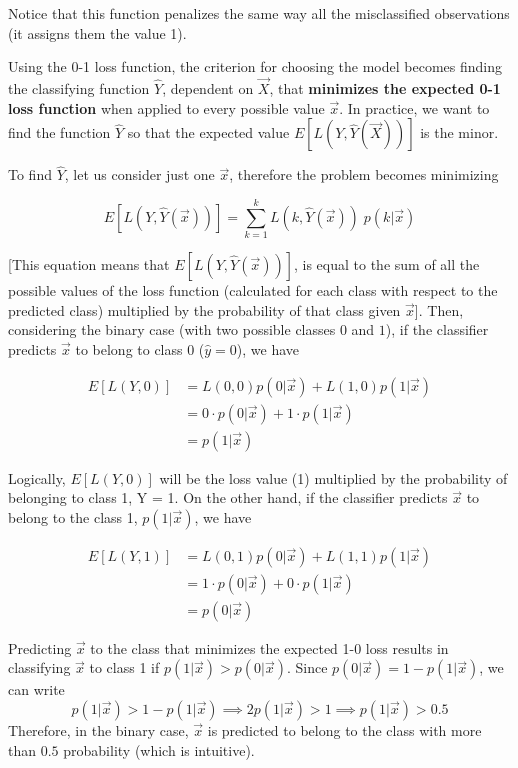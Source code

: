     Notice that this function penalizes the same way all the misclassified
    observations (it assigns them the value 1).  
    
    Using the 0-1 loss function, the criterion for choosing the model becomes
    finding the classifying function $\hat{Y}$, dependent on $\vec{X}$, that
    \textbf{minimizes the expected 0-1 loss function} when applied to every
    possible value $ \vec{x} $. In practice, we want to find the function $\hat{Y}$
    so that the expected value $ E[L(Y, \hat{Y}(\vec{X}))]$ is the minor.

    To find $\hat{Y}$, let us consider just one $\vec{x}$, therefore the problem
    becomes minimizing 

    $$E[L(Y, \hat{Y}(\vec{x}))] = \sum_{k=1}^k L(k, \hat{Y}(\vec{x})) \;
    p(k|\vec{x})$$

	[This equation means that $ E[L(Y, \hat{Y}(\vec{x}))] $, is equal to the sum
    of all the possible values of the loss function (calculated for each class
    with respect to the predicted class) multiplied by the probability of that
    class given $ \vec{x} $]. Then, considering the binary case (with two
    possible classes $0$ and $1$), if the classifier predicts $\vec{x}$ to
    belong to class 0 ($\hat{y} = 0$), we have 

    \begin{align*}
      E[L(Y,0)] & = L(0,0)p(0|\vec{x}) + L(1, 0)p(1|\vec{x}) \\
                & = 0 \cdot p(0|\vec{x}) + 1 \cdot p(1|\vec{x}) \\
                & = p(1|\vec{x})
    \end{align*}

Logically, $ E[L(Y,0)] $ will be the loss value (1) multiplied by the
probability of  belonging to class 1, Y = 1. On the other hand, if the
classifier predicts $\vec{x}$ to belong to the class 1, $p(1|\vec{x})$, we have

    \begin{align*}
      E[L(Y,1)] & = L(0,1)p(0|\vec{x}) + L(1, 1)p(1|\vec{x}) \\
                & = 1 \cdot p(0|\vec{x}) + 0 \cdot p(1|\vec{x}) \\
                & = p(0|\vec{x})
    \end{align*}

    Predicting $\vec{x}$ to the class that minimizes the expected 1-0 loss
    results in classifying $\vec{x}$ to class 1 if $p(1|\vec{x}) >
    p(0|\vec{x})$. Since $p(0|\vec{x}) = 1 - p(1|\vec{x})$, we can write
    $$p(1|\vec{x}) > 1 - p(1|\vec{x}) \implies 2p(1|\vec{x}) > 1 \implies
    p(1|\vec{x})>0.5$$ Therefore, in the binary case, $\vec{x}$ is predicted to
    belong to the class with more than $0.5$ probability (which is intuitive).

